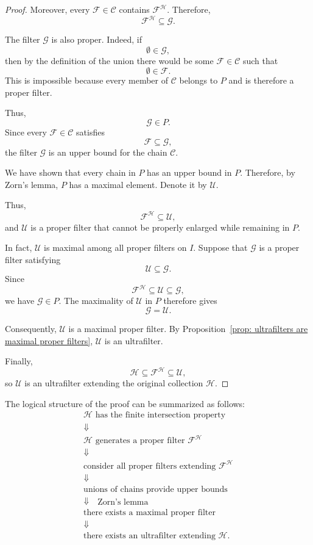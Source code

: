 {\begin{proof}
Moreover, every \(\mathcal{F}\in\mathcal{C}\) contains
\(\mathcal{F}^{\mathcal{H}}\). Therefore,
\[
\mathcal{F}^{\mathcal{H}}
\subseteq
\mathcal{G}.
\]

The filter \(\mathcal{G}\) is also proper. Indeed, if
\[
\emptyset\in\mathcal{G},
\]
then by the definition of the union there would be some
\(\mathcal{F}\in\mathcal{C}\) such that
\[
\emptyset\in\mathcal{F}.
\]
This is impossible because every member of \(\mathcal{C}\) belongs to \(P\)
and is therefore a proper filter.

Thus,
\[
\mathcal{G}\in P.
\]
Since every \(\mathcal{F}\in\mathcal{C}\) satisfies
\[
\mathcal{F}\subseteq\mathcal{G},
\]
the filter \(\mathcal{G}\) is an upper bound for the chain
\(\mathcal{C}\).

We have shown that every chain in \(P\) has an upper bound in \(P\).
Therefore, by Zorn's lemma, \(P\) has a maximal element. Denote it by
\(\mathcal{U}\).

Thus,
\[
\mathcal{F}^{\mathcal{H}}
\subseteq
\mathcal{U},
\]
and \(\mathcal{U}\) is a proper filter that cannot be properly enlarged
while remaining in \(P\).

In fact, \(\mathcal{U}\) is maximal among all proper filters on \(I\).
Suppose that \(\mathcal{G}\) is a proper filter satisfying
\[
\mathcal{U}\subseteq\mathcal{G}.
\]
Since
\[
\mathcal{F}^{\mathcal{H}}
\subseteq
\mathcal{U}
\subseteq
\mathcal{G},
\]
we have \(\mathcal{G}\in P\). The maximality of \(\mathcal{U}\) in \(P\)
therefore gives
\[
\mathcal{G}=\mathcal{U}.
\]

Consequently, \(\mathcal{U}\) is a maximal proper filter. By
Proposition~\ref{prop: ultrafilters are maximal proper filters},
\(\mathcal{U}\) is an ultrafilter.

Finally,
\[
\mathcal{H}
\subseteq
\mathcal{F}^{\mathcal{H}}
\subseteq
\mathcal{U},
\]
so \(\mathcal{U}\) is an ultrafilter extending the original collection
\(\mathcal{H}\).
\end{proof}

The logical structure of the proof can be summarized as follows:
\[
\boxed{
\begin{gathered}
\mathcal{H}\text{ has the finite intersection property}
\\[2mm]
\Downarrow
\\[2mm]
\mathcal{H}\text{ generates a proper filter }
\mathcal{F}^{\mathcal{H}}
\\[2mm]
\Downarrow
\\[2mm]
\text{consider all proper filters extending }
\mathcal{F}^{\mathcal{H}}
\\[2mm]
\Downarrow
\\[2mm]
\text{unions of chains provide upper bounds}
\\[2mm]
\Downarrow\quad\text{Zorn's lemma}
\\[2mm]
\text{there exists a maximal proper filter}
\\[2mm]
\Downarrow
\\[2mm]
\text{there exists an ultrafilter extending }\mathcal{H}.
\end{gathered}
}
\]

}
